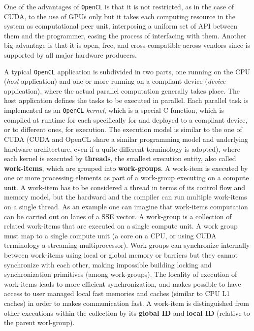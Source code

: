 \begin{description}
    One of the advantages of \texttt{OpenCL} is that it is not restricted, as in the case of CUDA\cite{NvidiaprogGuide}, to the use of GPUs only but it takes each computing resource in the system as computational peer unit, interposing a uniform set of API between them and the programmer, easing the process of interfacing with them. Another big advantage is that it is  open, free, and cross-compatible across vendors since is supported by all major hardware producers.
    
    A typical \texttt{OpenCL} application is subdivided in two parts, one
    running on the CPU (\textit{host} application) and one or more running on a
    compliant device (\textit{device} application), where the actual parallel
    computation generally takes place. The host application defines
    the tasks to be executed in parallel. Each parallel task is
    implemented as an \texttt{OpenCL} \emph{kernel}, which is a special C
    function, which is compiled at runtime for each specifically for and deployed to a compliant device, or to different ones, for execution. The execution model is similar to the one of CUDA (CUDA and OpenCL share a similar programming model and underlying hardware architecture, even if a quite different terminology is adopted), where each kernel is executed by \textbf{threads}, the smallest execution entity, also called \textbf{work-items}, which are grouped into \textbf{work-groups}. A work-item is executed by one or more processing elements as part of a work-group executing on a compute unit. A work-item has to be considered a thread in terms of its control flow and memory model, but the hardward and the compiler can run multiple work-items on a single thread. As an example one can imagine that work-items computation can be carried out on lanes of a SSE vector. 
    A work-group is a collection of related work-items that are executed on a single compute unit. A work group must map to a single compute unit (a core on a CPU, or using CUDA terminology a streaming multiprocessor). 
    Work-groups can synchronize internally between work-items using local or global memory or barriers but they cannot synchronize with each other, making impossible building locking and synchronization primitives (among work-groups).
    The  locality of execution of work-items  leads to more efficient synchronization, and makes possible to have access to user managed local fast memories and caches (similar to CPU L1 caches) in order to makes communication fast.    
    A work-item is distinguished from other executions within the collection by its \textbf{global ID} and \textbf{local ID} (relative to the parent worl-group).
    

\end{description}
